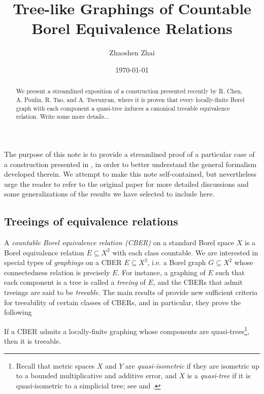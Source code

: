 \documentclass[reqno]{amsart}
\begin{document}
    \title{Tree-like Graphings of Countable Borel Equivalence Relations}
    \author{Zhaoshen Zhai}
    \date{\today}

    \begin{abstract}
        We present a streamlined exposition of a construction presented recently by R. Chen, A. Poulin, R. Tao, and A. Tserunyan, where it is proven that every locally-finite Borel graph with each component a quasi-tree induces a canonical treeable equivalence relation. {\color{red}Write some more details...}
    \end{abstract}

    \maketitle


    The purpose of this note is to provide a streamlined proof of a particular case of a construction presented in \cite{CPTT23}, in order to better understand the general formalism developed therein. We attempt to make this note self-contained, but nevertheless urge the reader to refer to the original paper for more detailed discussions and some generalizations of the results we have selected to include here.

    \subsection*{Treeings of equivalence relations}

    A \textit{countable Borel equivalence relation (CBER)} on a standard Borel space $X$ is a Borel equivalence relation $E\subseteq X^2$ with each class countable. We are interested in special types of \textit{graphings} on a CBER $E\subseteq X^2$, i.e. a Borel graph $G\subseteq X^2$ whose connectedness relation is precisely $E$. For instance, a graphing of $E$ such that each component is a tree is called a \textit{treeing} of $E$, and the CBERs that admit treeings are said to be \textit{treeable}. The main results of \cite{CPTT23} provide new sufficient criteria for treeability of certain classes of CBERs, and in particular, they prove the following

    \begin{mainTheorem}\label{thm:treeing_quasi-trees}
        If a CBER admits a locally-finite graphing whose components are quasi-trees\footnote{Recall that metric spaces $X$ and $Y$ are \textit{quasi-isometric} if they are isometric up to a bounded multiplicative and additive error, and $X$ is a \textit{quasi-tree} if it is quasi-isometric to a simplicial tree; see \cite{Gro93} and \cite{DK18}.}, then it is treeable.
    \end{mainTheorem}
\end{document}
